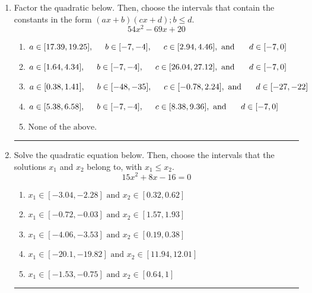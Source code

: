 \documentclass[14pt]{extbook}
\newcommand{\litem}[1]{\item#1\hspace*{-1cm}\rule{\textwidth}{0.4pt}}
\begin{document}
\begin{enumerate}
{\begin{enumerate}[label=\Alph*.]
\end{enumerate} }
\litem{
Factor the quadratic below. Then, choose the intervals that contain the constants in the form $(ax+b)(cx+d); b \leq d.$\[ 54x^{2} -69 x + 20 \]\begin{enumerate}[label=\Alph*.]
\item \( a \in [17.39, 19.25], \hspace*{5mm} b \in [-7, -4], \hspace*{5mm} c \in [2.94, 4.46], \text{ and } \hspace*{5mm} d \in [-7, 0] \)
\item \( a \in [1.64, 4.34], \hspace*{5mm} b \in [-7, -4], \hspace*{5mm} c \in [26.04, 27.12], \text{ and } \hspace*{5mm} d \in [-7, 0] \)
\item \( a \in [0.38, 1.41], \hspace*{5mm} b \in [-48, -35], \hspace*{5mm} c \in [-0.78, 2.24], \text{ and } \hspace*{5mm} d \in [-27, -22] \)
\item \( a \in [5.38, 6.58], \hspace*{5mm} b \in [-7, -4], \hspace*{5mm} c \in [8.38, 9.36], \text{ and } \hspace*{5mm} d \in [-7, 0] \)
\item \( \text{None of the above.} \)

\end{enumerate} }
\litem{
Solve the quadratic equation below. Then, choose the intervals that the solutions $x_1$ and $x_2$ belong to, with $x_1 \leq x_2$.\[ 15x^{2} +8 x -16 = 0 \]\begin{enumerate}[label=\Alph*.]
\item \( x_1 \in [-3.04, -2.28] \text{ and } x_2 \in [0.32, 0.62] \)
\item \( x_1 \in [-0.72, -0.03] \text{ and } x_2 \in [1.57, 1.93] \)
\item \( x_1 \in [-4.06, -3.53] \text{ and } x_2 \in [0.19, 0.38] \)
\item \( x_1 \in [-20.1, -19.82] \text{ and } x_2 \in [11.94, 12.01] \)
\item \( x_1 \in [-1.53, -0.75] \text{ and } x_2 \in [0.64, 1] \)


\end{enumerate}}
\end{enumerate}
\end{document}
